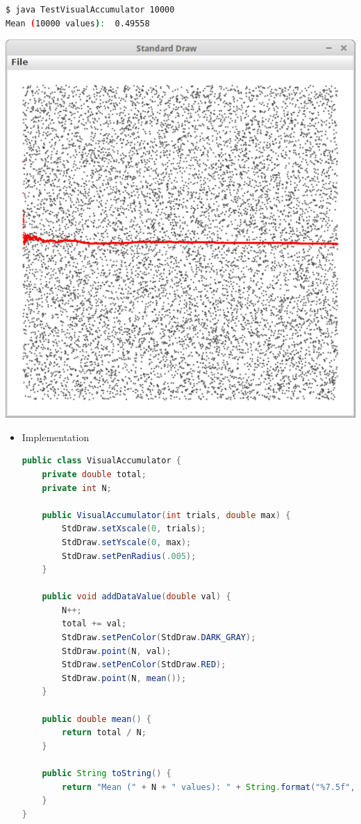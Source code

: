 \documentclass[8pt,a4paper,compress]{beamer}
\begin{document}
\begin{frame}[fragile]
\begin{itemize}
\begin{minipage}{160pt}
\begin{lstlisting}[language=bash]
$ java TestVisualAccumulator 10000
Mean (10000 values):  0.49558
\end{lstlisting}
\end{minipage}%
\begin{minipage}{120pt}
\hfill \includegraphics[scale=0.13]{./figures/visual_acc.pdf}
\end{minipage}
\end{itemize}
\end{frame}

\begin{frame}[fragile]
\pause

\begin{itemize}
\item Implementation
\begin{lstlisting}[language=Java]
public class VisualAccumulator {
    private double total;
    private int N;

    public VisualAccumulator(int trials, double max) {
        StdDraw.setXscale(0, trials);
        StdDraw.setYscale(0, max);
        StdDraw.setPenRadius(.005);
    }

    public void addDataValue(double val) {
        N++;
        total += val;
        StdDraw.setPenColor(StdDraw.DARK_GRAY);
        StdDraw.point(N, val);
        StdDraw.setPenColor(StdDraw.RED);
        StdDraw.point(N, mean());
    }

    public double mean() {
        return total / N;
    }

    public String toString() {
        return "Mean (" + N + " values): " + String.format("%7.5f", mean());
    }
}
\end{lstlisting}
\end{itemize}
\end{frame}
\end{document}
